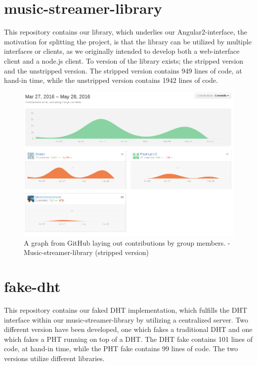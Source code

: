 \section{music-streamer-library}
\label{sec:appendix-music-streamer-library}
This repository contains our library, which underlies our Angular2-interface,
the motivation for splitting the project, is that the library can be utilized 
by multiple interfaces or clients, as we originally intended to develop both a
web-interface client and a node.js client.
\newline\newline
To version of the library exists; the stripped version and the unstripped
version. The stripped version contains 949 lines of code, at hand-in time, while
the unstripped version contains 1942 lines of code.

\begin{figure}[H]
  \centering
    \includegraphics[width=\linewidth]{gfx/Music-streamer-library}
    \caption{A graph from GitHub laying out contributions by group members. - Music-streamer-library (stripped version)}
  \label{fig:music-streamer-library}
\end{figure}

\section{fake-dht}
This repository contains our faked \acs{DHT} implementation, which fulfills the \acs{DHT}
interface within our music-streamer-library by utilizing a centralized server.
\newline
Two different version have been developed, one which fakes a traditional \acs{DHT}
and one which fakes a \acs{PHT} running on top of a \acs{DHT}.
\newline\newline
The \acs{DHT} fake contains 101 lines of code, at hand-in time, while the \acs{PHT} fake 
contains 99 lines of code. The two versions utilize different libraries.

